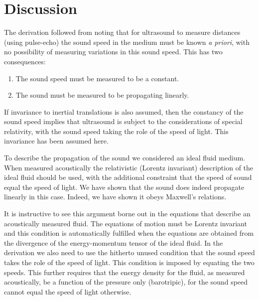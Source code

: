 \documentclass[10pt, fleqn,final,showtrims,oldfontcommands]{article} %
\begin{document}
\section{Discussion}




The derivation followed from noting that for ultrasound to measure distances (using pulse-echo) 
the sound speed in the medium must be known {\em a priori}, 
with no possibility of measuring variations in this sound speed.
This has two consequences:
\begin{enumerate}
  \item The sound speed must be measured to be a constant.
  \item The sound must be measured to be propagating linearly.
\end{enumerate}
If invariance to inertial translations is also assumed,
then the constancy of the sound speed  implies that 
ultrasound is subject to the considerations of special relativity,
with the sound speed taking the role of the speed of light.
This invariance has been assumed here.

To describe the propagation of the sound we considered an ideal fluid medium.
When measured acoustically the relativistic (Lorentz invariant) description of the ideal fluid should be used,
with the additional constraint that the speed of sound equal the speed of light.
We have shown that the sound does indeed propagate linearly in this case.
Indeed, we have shown it obeys Maxwell's relations.


It is instructive to see this argument borne out in the equations that describe an acoustically measured fluid.
The equations of motion must  be Lorentz invariant and this condition  is automatically fulfilled  when  the equations 
are obtained from the divergence of the energy-momentum tensor of the ideal fluid.
In the derivation we also need to use the hitherto unused  condition
that the sound speed takes the role  of the speed of light.
This condition is imposed by equating the two speeds.
This further requires that the energy density for the fluid, as measured acoustically, be a function of the pressure only (barotripic),
for the sound speed cannot equal the speed of light otherwise\cite{Taub1978}.





\end{document}
